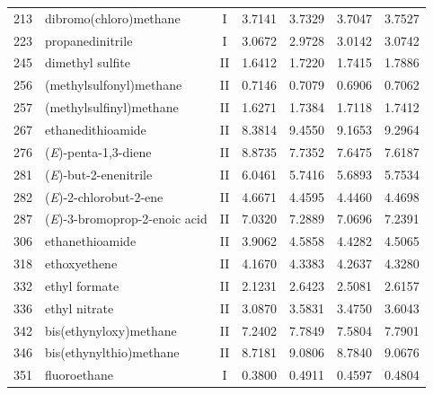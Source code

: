 \begin{longtable}{rlcd{2.5}d{2.5}d{2.5}d{2.5}}
    213  & dibromo(chloro)methane                                 & I  & 3.7141  & 3.7329  & 3.7047  & 3.7527  \\
    223  & propanedinitrile                                       & I  & 3.0672  & 2.9728  & 3.0142  & 3.0742  \\
    245  & dimethyl sulfite                                       & II & 1.6412  & 1.7220  & 1.7415  & 1.7886  \\
    256  & (methylsulfonyl)methane                                & II & 0.7146  & 0.7079  & 0.6906  & 0.7062  \\
    257  & (methylsulfinyl)methane                                & II & 1.6271  & 1.7384  & 1.7118  & 1.7412  \\
    267  & ethanedithioamide                                      & II & 8.3814  & 9.4550  & 9.1653  & 9.2964  \\
    276  & (\textit{E})-penta-1,3-diene                           & II & 8.8735  & 7.7352  & 7.6475  & 7.6187  \\
    281  & (\textit{E})-but-2-enenitrile                          & II & 6.0461  & 5.7416  & 5.6893  & 5.7534  \\
    282  & (\textit{E})-2-chlorobut-2-ene                         & II & 4.6671  & 4.4595  & 4.4460  & 4.4698  \\
    287  & (\textit{E})-3-bromoprop-2-enoic   acid                & II & 7.0320  & 7.2889  & 7.0696  & 7.2391  \\
    306  & ethanethioamide                                        & II & 3.9062  & 4.5858  & 4.4282  & 4.5065  \\
    318  & ethoxyethene                                           & II & 4.1670  & 4.3383  & 4.2637  & 4.3280  \\
    332  & ethyl formate                                          & II & 2.1231  & 2.6423  & 2.5081  & 2.6157  \\
    336  & ethyl nitrate                                          & II & 3.0870  & 3.5831  & 3.4750  & 3.6043  \\
    342  & bis(ethynyloxy)methane                                 & II & 7.2402  & 7.7849  & 7.5804  & 7.7901  \\
    346  & bis(ethynylthio)methane                                & II & 8.7181  & 9.0806  & 8.7840  & 9.0676  \\
    351  & fluoroethane                                           & I  & 0.3800  & 0.4911  & 0.4597  & 0.4804  \\

\end{longtable}
